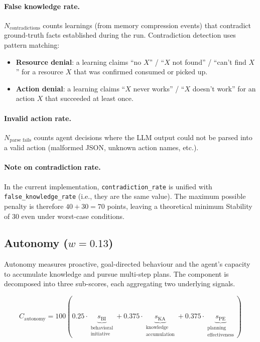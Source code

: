 \documentclass[a4paper, 11pt]{article}
\begin{document}
\paragraph{False knowledge rate.} $N_{\text{contradictions}}$ counts learnings (from memory compression events) that contradict ground-truth facts established during the run. Contradiction detection uses pattern matching:
\begin{itemize}[nosep]
    \item \textbf{Resource denial}: a learning claims ``no $X$'' / ``$X$ not found'' / ``can't find $X$'' for a resource $X$ that was confirmed consumed or picked up.
    \item \textbf{Action denial}: a learning claims ``$X$ never works'' / ``$X$ doesn't work'' for an action $X$ that succeeded at least once.
\end{itemize}

\paragraph{Invalid action rate.} $N_{\text{parse fails}}$ counts agent decisions where the LLM output could not be parsed into a valid action (malformed JSON, unknown action names, etc.).

\paragraph{Note on contradiction rate.} In the current implementation, \texttt{contradiction\_rate} is unified with \texttt{false\_knowledge\_rate} (i.e., they are the same value). The maximum possible penalty is therefore $40 + 30 = 70$ points, leaving a theoretical minimum Stability of $30$ even under worst-case conditions.

\subsection{Autonomy ($w = 0.13$)}

Autonomy measures proactive, goal-directed behaviour and the agent's capacity to accumulate knowledge and pursue multi-step plans. The component is decomposed into three sub-scores, each aggregating two underlying signals.

\begin{equation}
C_{\text{autonomy}} = 100 \left(
    0.25 \cdot \underbrace{s_{\text{BI}}}_{\substack{\text{behavioral} \\ \text{initiative}}}
    + 0.375 \cdot \underbrace{s_{\text{KA}}}_{\substack{\text{knowledge} \\ \text{accumulation}}}
    + 0.375 \cdot \underbrace{s_{\text{PE}}}_{\substack{\text{planning} \\ \text{effectiveness}}}
\right)
\label{eq:autonomy}
\end{equation}
\end{document}
